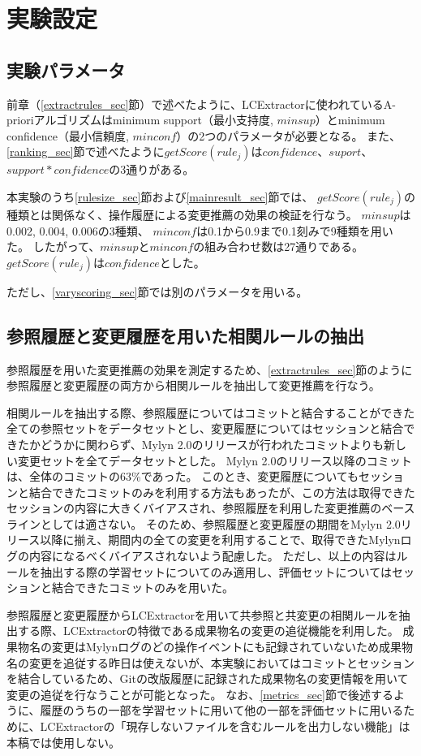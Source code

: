 \documentclass[a4paper]{jsbook}
\newcommand{\minconf}{mincon\!f}
\newcommand{\confidence}{con\!f\!idence}
\newcommand{\getScore}{getS\!core}
\begin{document}
\section{実験設定}\label{setting_sec}
\subsection{実験パラメータ}
前章（\ref{extractrules_sec}節）で述べたように、LCExtractorに使われているA-prioriアルゴリズムはminimum support（最小支持度, $minsup$）とminimum confidence（最小信頼度, $\minconf$）の2つのパラメータが必要となる。
また、\ref{ranking_sec}節で述べたように$\getScore(rule_j)$は$\confidence$、$suport$、$support*\confidence$の3通りがある。

本実験のうち\ref{rulesize_sec}節および\ref{mainresult_sec}節では、
$\getScore(rule_j)$の種類とは関係なく、操作履歴による変更推薦の効果の検証を行なう。
$minsup$は0.002, 0.004, 0.006の3種類、
$\minconf$は0.1から0.9まで0.1刻みで9種類を用いた。
したがって、$minsup$と$\minconf$の組み合わせ数は27通りである。
$\getScore(rule_j)$は$\confidence$とした。

ただし、\ref{varyscoring_sec}節では別のパラメータを用いる。


\subsection{参照履歴と変更履歴を用いた相関ルールの抽出}
参照履歴を用いた変更推薦の効果を測定するため、\ref{extractrules_sec}節のように参照履歴と変更履歴の両方から相関ルールを抽出して変更推薦を行なう。

相関ルールを抽出する際、参照履歴についてはコミットと結合することができた全ての参照セットをデータセットとし、変更履歴についてはセッションと結合できたかどうかに関わらず、Mylyn 2.0のリリースが行われたコミットよりも新しい変更セットを全てデータセットとした。
Mylyn 2.0のリリース以降のコミットは、全体のコミットの63\%であった。
このとき、変更履歴についてもセッションと結合できたコミットのみを利用する方法もあったが、この方法は取得できたセッションの内容に大きくバイアスされ、参照履歴を利用した変更推薦のベースラインとしては適さない。
そのため、参照履歴と変更履歴の期間をMylyn 2.0リリース以降に揃え、期間内の全ての変更を利用することで、取得できたMylynログの内容になるべくバイアスされないよう配慮した。
ただし、以上の内容はルールを抽出する際の学習セットについてのみ適用し、評価セットについてはセッションと結合できたコミットのみを用いた。

参照履歴と変更履歴からLCExtractorを用いて共参照と共変更の相関ルールを抽出する際、LCExtractorの特徴である成果物名の変更の追従機能を利用した。
成果物名の変更はMylynログのどの操作イベントにも記録されていないため成果物名の変更を追従する昨日は使えないが、本実験においてはコミットとセッションを結合しているため、Gitの改版履歴に記録された成果物名の変更情報を用いて変更の追従を行なうことが可能となった。
なお、\ref{metrics_sec}節で後述するように、履歴のうちの一部を学習セットに用いて他の一部を評価セットに用いるために、LCExtractorの「現存しないファイルを含むルールを出力しない機能」は本稿では使用しない。
\end{document}
